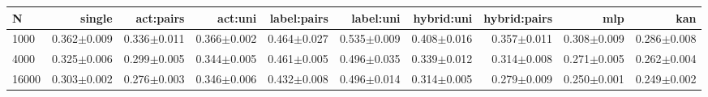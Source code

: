 \begin{tabular}{@{}lrrrrrrrrr@{}}\toprule
N & single & act:pairs & act:uni & label:pairs & label:uni & hybrid:uni & hybrid:pairs & mlp & kan\\\midrule
1000 & 0.362$\pm$0.009 & 0.336$\pm$0.011 & 0.366$\pm$0.002 & 0.464$\pm$0.027 & 0.535$\pm$0.009 & 0.408$\pm$0.016 & 0.357$\pm$0.011 & 0.308$\pm$0.009 & 0.286$\pm$0.008\\
4000 & 0.325$\pm$0.006 & 0.299$\pm$0.005 & 0.344$\pm$0.005 & 0.461$\pm$0.005 & 0.496$\pm$0.035 & 0.339$\pm$0.012 & 0.314$\pm$0.008 & 0.271$\pm$0.005 & 0.262$\pm$0.004\\
16000 & 0.303$\pm$0.002 & 0.276$\pm$0.003 & 0.346$\pm$0.006 & 0.432$\pm$0.008 & 0.496$\pm$0.014 & 0.314$\pm$0.005 & 0.279$\pm$0.009 & 0.250$\pm$0.001 & 0.249$\pm$0.002\\
\bottomrule\end{tabular}